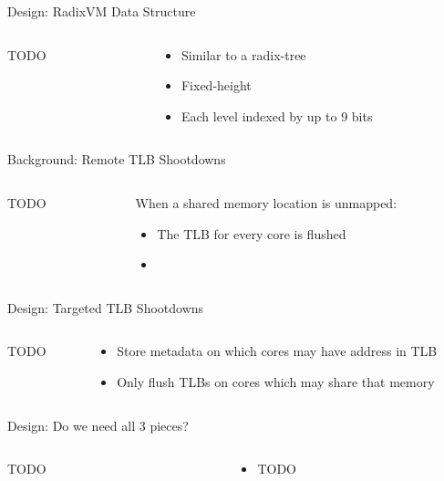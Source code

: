 \documentclass[aspectratio=169]{beamer}
\newcommand{\bi}{\begin{itemize}}
\newcommand{\ei}{\end{itemize}}
\begin{document}
\begin{frame}{Design: RadixVM Data Structure}
  \begin{columns}[T]
    \begin{column}{0.2\textwidth}
      TODO
    \end{column}
    \begin{column}{0.8\textwidth}
      \bi
    \item Similar to a radix-tree
    \item Fixed-height
    \item Each level indexed by up to 9 bits
      \ei
    \end{column}
  \end{columns}
\end{frame}

\begin{frame}{Background: Remote TLB Shootdowns}
  \begin{columns}[T]
    \begin{column}{0.2\textwidth}
      TODO
    \end{column}
    \begin{column}{0.8\textwidth}
      When a shared memory location is unmapped:
      \bi
    \item The TLB for every core is flushed
    \item \color{red}{This is expensive!}
      \ei
    \end{column}
  \end{columns}
\end{frame}

\begin{frame}{Design: Targeted TLB Shootdowns}
  \begin{columns}[T]
    \begin{column}{0.2\textwidth}
      TODO
    \end{column}
    \begin{column}{0.8\textwidth}
      \bi
    \item Store metadata on which cores may have address in TLB
    \item Only flush TLBs on cores which may share that memory
      \ei
    \end{column}
  \end{columns}
\end{frame}

\begin{frame}{Design: Do we need all 3 pieces?}
  \begin{columns}[T]
    \begin{column}{0.2\textwidth}
      TODO
    \end{column}
    \begin{column}{0.8\textwidth}
      \bi
    \item TODO
      \ei
    \end{column}
  \end{columns}
\end{frame}
\end{document}
